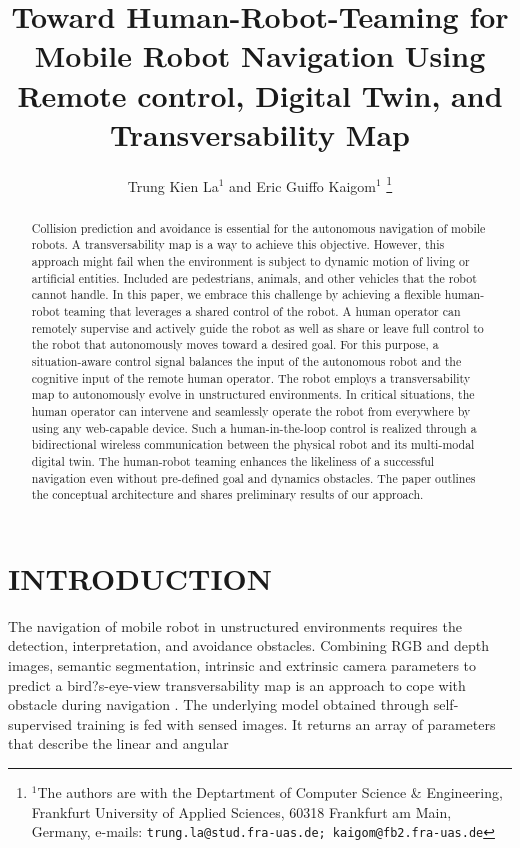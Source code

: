 \documentclass[letterpaper, 10 pt, conference]{ieeeconf}  %
\title{\LARGE \bf
Toward Human-Robot-Teaming for Mobile Robot Navigation Using
 Remote control,  Digital Twin, and  Transversability Map
}
\author{Trung Kien La$^{1}$ and Eric Guiffo Kaigom$^{1}$%
\thanks{$^{1}$The authors are with the Deptartment of Computer Science \& Engineering,
        Frankfurt University of Applied Sciences, 60318 Frankfurt am Main, Germany, e-mails:
        {\tt\small trung.la@stud.fra-uas.de; kaigom@fb2.fra-uas.de}}%
}
\begin{document}
\maketitle
\thispagestyle{empty}
\pagestyle{empty}


\begin{abstract}

Collision prediction and avoidance is essential for the autonomous navigation of mobile robots. A transversability map is a way to achieve this objective. However, this approach might fail when the environment is subject to  dynamic motion of living or artificial entities. Included are pedestrians, animals, and other vehicles that the robot cannot handle. In this paper, we  embrace this challenge by achieving a flexible human-robot teaming that leverages a shared control of the robot. A human operator can remotely supervise and actively guide the robot as well as  share or leave full control to the robot that autonomously moves toward a desired goal. For this purpose, a situation-aware control signal balances the input of the autonomous robot and the cognitive input of the  remote human operator. The robot employs a  transversability map to autonomously evolve in unstructured environments. In critical situations, the human operator can  intervene and seamlessly operate the robot from everywhere by using any web-capable device.  Such a human-in-the-loop control is realized through a bidirectional wireless communication between the physical robot and its multi-modal digital twin.  The human-robot teaming enhances the likeliness of a successful navigation even without pre-defined goal and dynamics obstacles. The paper outlines the conceptual architecture and shares preliminary results of our approach.

\end{abstract}


\section{INTRODUCTION}
The navigation of mobile robot in unstructured environments requires the detection, interpretation, and avoidance obstacles. Combining  RGB and depth images, semantic segmentation,  intrinsic and extrinsic  camera parameters to predict a bird?s-eye-view transversability map is an approach to cope with obstacle during navigation \cite{wayfast}. The underlying model obtained through self-supervised training is fed with sensed images. It returns an array of parameters that describe the linear and angular  
\end{document}
